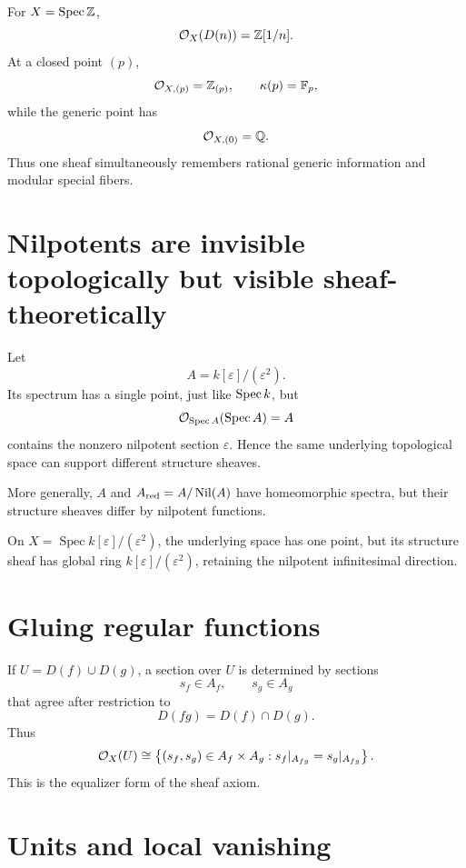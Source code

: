For $X=\operatorname{Spec}\mathbb Z$,
\[
\mathcal O_X(D(n))=\mathbb Z[1/n].
\]
At a closed point $(p)$,
\[
\mathcal O_{X,(p)}=\mathbb Z_{(p)},
\qquad
\kappa(p)=\mathbb F_p,
\]
while the generic point has
\[
\mathcal O_{X,(0)}=\mathbb Q.
\]
Thus one sheaf simultaneously remembers rational generic information and modular special
fibers.



\section{Nilpotents are invisible topologically but visible sheaf-theoretically}

Let
\[
A=k[\varepsilon]/(\varepsilon^2).
\]
Its spectrum has a single point, just like $\operatorname{Spec} k$, but
\[
\mathcal O_{\operatorname{Spec} A}(\operatorname{Spec} A)=A
\]
contains the nonzero nilpotent section $\varepsilon$.  Hence the same underlying topological
space can support different structure sheaves.

More generally, $A$ and $A_{\mathrm{red}}=A/\operatorname{Nil}(A)$ have homeomorphic spectra, but their
structure sheaves differ by nilpotent functions.



\begin{example}\label{ex:vi17-expand-03}
On $X=\operatorname{Spec}k[\varepsilon]/(\varepsilon^2)$, the underlying space has one point, but its structure sheaf has global ring $k[\varepsilon]/(\varepsilon^2)$, retaining the nilpotent infinitesimal direction.
\end{example}
\section{Gluing regular functions}

If $U=D(f)\cup D(g)$, a section over $U$ is determined by sections
\[
s_f\in A_f,
\qquad
s_g\in A_g
\]
that agree after restriction to
\[
D(fg)=D(f)\cap D(g).
\]
Thus
\[
\mathcal O_X(U)
\cong
\left\{(s_f,s_g)\in A_f\times A_g:
 s_f|_{A_{fg}}=s_g|_{A_{fg}}\right\}.
\]
This is the equalizer form of the sheaf axiom.



\section{Units and local vanishing}

